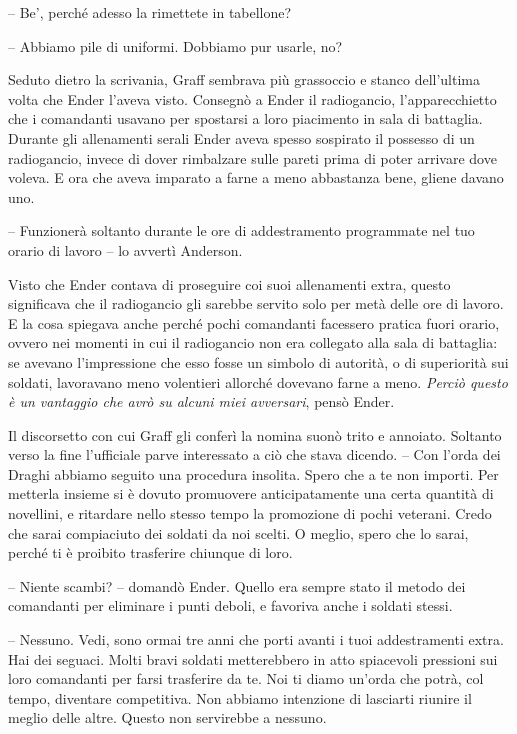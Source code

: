 {-- Be', perché adesso la rimettete in tabellone?}

{-- Abbiamo pile di uniformi. Dobbiamo pur usarle, no?}

{Seduto dietro la scrivania, Graff sembrava più grassoccio e stanco
	dell'ultima volta che Ender l'aveva visto. Consegnò a Ender il
	radiogancio, l'apparecchietto che i comandanti usavano per spostarsi a
	loro piacimento in sala di battaglia. Durante gli allenamenti serali
	Ender aveva spesso sospirato il possesso di un radiogancio, invece di
	dover rimbalzare sulle pareti prima di poter arrivare dove voleva. E ora
	che aveva imparato a farne a meno abbastanza bene, gliene davano uno.}

{-- Funzionerà soltanto durante le ore di addestramento programmate nel
	tuo orario di lavoro -- lo avvertì Anderson.}

{Visto che Ender contava di proseguire coi suoi allenamenti extra,
	questo significava che il radiogancio gli sarebbe servito solo per metà
	delle ore di lavoro. E la cosa spiegava anche perché pochi comandanti
	facessero pratica fuori orario, ovvero nei momenti in cui il radiogancio
	non era collegato alla sala di battaglia: se avevano l'impressione che
	esso fosse un simbolo di autorità, o di superiorità sui soldati,
	lavoravano meno volentieri allorché dovevano farne a meno. \emph{Perciò
		questo è un vantaggio che avrò su alcuni miei avversari}, \emph{} pensò
	Ender.}

{Il discorsetto con cui Graff gli conferì la nomina suonò trito e
	annoiato. Soltanto verso la fine l'ufficiale parve interessato a ciò che
	stava dicendo. -- Con l'orda dei Draghi abbiamo seguito una procedura
	insolita. Spero che a te non importi. Per metterla insieme si è dovuto
	promuovere anticipatamente una certa quantità di novellini, e ritardare
	nello stesso tempo la promozione di pochi veterani. Credo che sarai
	compiaciuto dei soldati da noi scelti. O meglio, spero che lo sarai,
	perché ti è proibito trasferire chiunque di loro.}

{-- Niente scambi? -- domandò Ender. Quello era sempre stato il metodo
	dei comandanti per eliminare i punti deboli, e favoriva anche i soldati
	stessi.}

{-- Nessuno. Vedi, sono ormai tre anni che porti avanti i tuoi
	addestramenti extra. Hai dei seguaci. Molti bravi soldati metterebbero
	in atto spiacevoli pressioni sui loro comandanti per farsi trasferire da
	te. Noi ti diamo un'orda che potrà, col tempo, diventare competitiva.
	Non abbiamo intenzione di lasciarti riunire il meglio delle altre.
	Questo non servirebbe a nessuno.}

